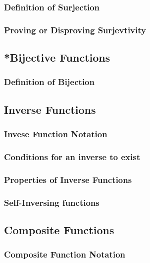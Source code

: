 \documentclass[../main.tex]{subfiles}
\begin{document}
\subsubsection{Definition of Surjection}

\subsubsection{Proving or Disproving Surjevtivity}

\subsection{*Bijective Functions}

\subsubsection{Definition of Bijection}

\subsection{Inverse Functions}

\subsubsection{Invese Function Notation}

\subsubsection{Conditions for an inverse to exist}

\subsubsection{Properties of Inverse Functions}

\subsubsection{Self-Inversing functions}

\subsection{Composite Functions}

\subsubsection{Composite Function Notation}
\end{document}
